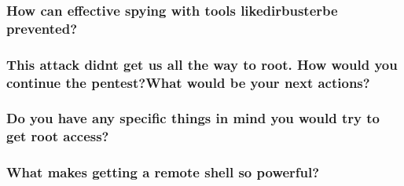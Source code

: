 \subsubsection{How can effective spying with tools likedirbusterbe prevented?}

\subsubsection{This attack didnt get us all the way to root. How would you continue the pentest?What would be your next actions?}

\subsubsection{Do you have any specific things in mind you would try to get root access?}

\subsubsection{What makes getting a remote shell so powerful?}

